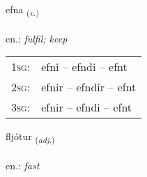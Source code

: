\documentclass[frontgrid, backgrid]{flacards}\usepackage[]{graphicx}\usepackage[]{xcolor}
\begin{document}
\renewcommand{\flhead}{\vskip5pt \fboxsep=0pt {\small\bfseries\footnotesize Sagnorð | Verb}}
\renewcommand{\fcfoot}{\vskip5pt \fboxsep=0pt \hspace{2pt}{\small\bfseries\footnotesize 2K}}

\renewcommand{\blhead}{\vskip5pt {\small\bfseries\footnotesize Sagnorð | Verb }}
\renewcommand{\bcfoot}{\vskip5pt \hspace{2pt}{\small\bfseries\footnotesize 2K}}


{efna \small{\textsubscript{(\textit{v.})}} \\[1ex] %
\textphonetic{[ɛpna]} \\
en.: \emph{fulfil; keep} \\  [2ex]
\renewcommand*{\arraystretch}{0.8}
\begin{tabular}{p{1cm}l}
\textsc{1sg}: & efni -- efndi -- efnt \\ 
\textsc{2sg}: & efnir -- efndir -- efnt \\ 
\textsc{3sg}: & efnir -- efndi -- efnt \\ 
\end{tabular}
}

\renewcommand{\flhead}{\vskip5pt \fboxsep=0pt {\small\bfseries\footnotesize Lýsingarorð | Adjective}}
\renewcommand{\fcfoot}{\vskip5pt \fboxsep=0pt \hspace{2pt}{\small\bfseries\footnotesize 2K}}

\renewcommand{\blhead}{\vskip5pt {\small\bfseries\footnotesize Lýsingarorð | Adjective }}
\renewcommand{\bcfoot}{\vskip5pt \hspace{2pt}{\small\bfseries\footnotesize 2K}}


{fljótur \small{\textsubscript{(\textit{adj.})}} \\[1ex] %
\textphonetic{[fljouːtʏr]} \\
en.: \emph{fast} \\  [2ex]
\renewcommand*{\arraystretch}{0.8}
}
\end{document}
